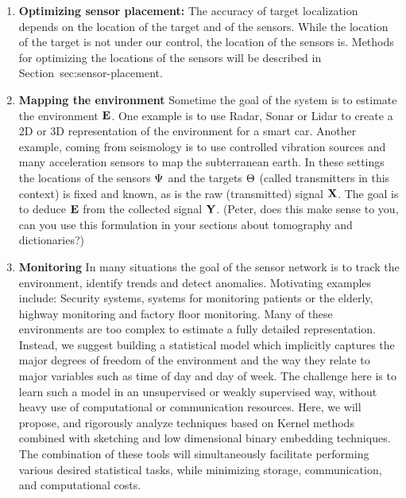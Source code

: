 \begin{enumerate}
    \item {\bf Optimizing sensor placement:} The accuracy of target
      localization depends on the location of the target and of the
      sensors. While the location of the target is not under our
      control, the location of the sensors is. Methods for optimizing
      the locations of the sensors will be described in
      Section~{sec:sensor-placement.}
    
    \item{\bf Mapping the environment} Sometime the goal of the system
      is to estimate the environment $\mathbf{E}$. One example is to use
      Radar, Sonar or Lidar to create a 2D or 3D representation of the
      environment for a smart car. Another example, coming from
      seismology is to use controlled vibration sources and many
      acceleration sensors to map the subterranean earth. In these
      settings the locations of the sensors $\Psi$ and the targets
      $\Theta$ (called transmitters in this context) is fixed and
      known, as is the raw (transmitted) signal $\mathbf{X}$. The goal
      is to deduce $\mathbf{E}$ from the collected signal
      $\mathbf{Y}$. (Peter, does this make sense to you, can you use
      this formulation in your sections about tomography and
      dictionaries?)
    
    \item {\bf Monitoring} In many situations the goal of the sensor
      network is to track the environment, identify trends and detect
      anomalies. Motivating examples include: Security systems,
      systems for monitoring patients or the elderly, highway
      monitoring and factory floor monitoring. Many of these
      environments are too complex to estimate a fully detailed
      representation. Instead, we suggest building a statistical model
      which implicitly captures the major degrees of freedom of the
      environment and the way they relate to major variables such as
      time of day and day of week.  The challenge here is to learn
      such a model in an unsupervised or weakly supervised way,
      without heavy use of computational or communication
      resources. Here, we will propose, and rigorously analyze
      techniques based on Kernel methods combined with sketching and
      low dimensional binary embedding techniques. The combination of
      these tools will simultaneously facilitate performing various
      desired statistical tasks, while minimizing storage,
      communication, and computational costs.
    
\end{enumerate}

